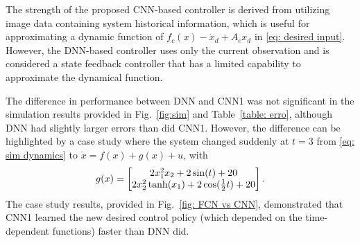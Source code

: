 \documentclass[letterpaper, 10 pt, conference]{ieeeconf}  %
\begin{document}
The strength of the proposed CNN-based controller is derived from utilizing image data containing system historical information, which is useful for approximating a dynamic function of $f_c(x)-\dot x_d+A_cx_d$ in \eqref{eq: desired input}. However, the DNN-based controller uses only the current observation and is considered a state feedback controller that has a limited capability to approximate the dynamical function. %

The difference in performance between DNN and CNN1 was not significant in the simulation results provided in Fig.~\ref{fig:sim} and Table~\ref{table: erro}, although DNN had slightly larger errors than did CNN1. However, the difference can be highlighted by a case study where the system changed suddenly at $t=3$ from \eqref{eq: sim dynamics} to $\dot x = f(x)+g(x)+u$, with 
\begin{equation}
    g(x) = 
	\begin{bmatrix}
		2x_1^2x_2 + 2\sin(t)+20\\
		2x_2^2\tanh(x_1)+2\cos({1\over2}t)+20
	\end{bmatrix}.
\end{equation}
The case study results, provided in Fig.~\ref{fig: FCN vs CNN}, demonstrated that CNN1 learned the new desired control policy (which depended on the time-dependent functions) faster than DNN did.
\end{document}
